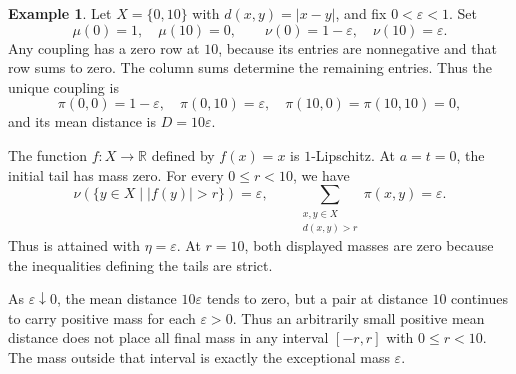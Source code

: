 \documentclass[a4paper,11pt]{article}
\theoremstyle{definition}
\newtheorem{example}[theorem]{Example}
\theoremstyle{remark}
\begin{document}
\begin{example}
Let $X=\{0,10\}$ with $d(x,y)=|x-y|$, and fix $0<\varepsilon<1$. Set
\[ \mu(0)=1,\quad \mu(10)=0,\qquad \nu(0)=1-\varepsilon,\quad \nu(10)=\varepsilon. \]
Any coupling has a zero row at $10$, because its entries are nonnegative and that row sums to zero. The column sums determine the remaining entries. Thus the unique coupling is
\[ \pi(0,0)=1-\varepsilon,\quad \pi(0,10)=\varepsilon,\quad \pi(10,0)=\pi(10,10)=0, \]
and its mean distance is $D=10\varepsilon$.

The function $f\colon X\to\mathbb R$ defined by $f(x)=x$ is $1$-Lipschitz. At $a=t=0$, the initial tail has mass zero. For every $0\leq r<10$, we have
\[ \nu(\{y\in X\mid |f(y)|>r\})=\varepsilon,\qquad \sum_{\substack{x,y\in X\\d(x,y)>r}}\pi(x,y)=\varepsilon. \]
Thus  is attained with $\eta=\varepsilon$. At $r=10$, both displayed masses are zero because the inequalities defining the tails are strict.

As $\varepsilon\downarrow0$, the mean distance $10\varepsilon$ tends to zero, but a pair at distance $10$ continues to carry positive mass for each $\varepsilon>0$. Thus an arbitrarily small positive mean distance does not place all final mass in any interval $[-r,r]$ with $0\leq r<10$. The mass outside that interval is exactly the exceptional mass $\varepsilon$.
\end{example}
\end{document}
